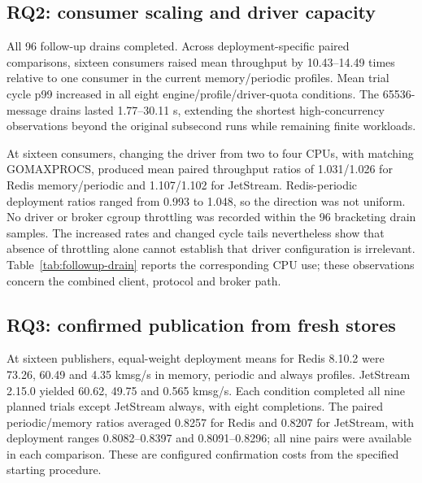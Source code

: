 \subsection{RQ2: consumer scaling and driver capacity}

All 96 follow-up drains completed. Across deployment-specific paired comparisons, sixteen consumers raised mean throughput by 10.43--14.49 times relative to one consumer in the current memory/periodic profiles. Mean trial cycle p99 increased in all eight engine/profile/driver-quota conditions. The 65536-message drains lasted 1.77--30.11 s, extending the shortest high-concurrency observations beyond the original subsecond runs while remaining finite workloads.

At sixteen consumers, changing the driver from two to four CPUs, with matching GOMAXPROCS, produced mean paired throughput ratios of 1.031/1.026 for Redis memory/periodic and 1.107/1.102 for JetStream. Redis-periodic deployment ratios ranged from 0.993 to 1.048, so the direction was not uniform. No driver or broker cgroup throttling was recorded within the 96 bracketing drain samples. The increased rates and changed cycle tails nevertheless show that absence of throttling alone cannot establish that driver configuration is irrelevant. Table~\ref{tab:followup-drain} reports the corresponding CPU use; these observations concern the combined client, protocol and broker path.

\begin{table}[htbp]
\centering\small\setlength{\tabcolsep}{3pt}

\caption{Current-release drain results. CPU is the driver's configured quota; $X_1$ and $X_{16}$ are throughput in kmsg/s. Point values equally weight campaign means. The speedup column gives the mean and range of campaign-specific paired ratios. Driver/Broker are mean CPU cores used during the bracketing samples at $C=16$, not percentages. M/P denote memory/periodic.}
\label{tab:followup-drain}
\end{table}

\subsection{RQ3: confirmed publication from fresh stores}

At sixteen publishers, equal-weight deployment means for Redis 8.10.2 were 73.26, 60.49 and 4.35 kmsg/s in memory, periodic and always profiles. JetStream 2.15.0 yielded 60.62, 49.75 and 0.565 kmsg/s. Each condition completed all nine planned trials except JetStream always, with eight completions. The paired periodic/memory ratios averaged 0.8257 for Redis and 0.8207 for JetStream, with deployment ranges 0.8082--0.8397 and 0.8091--0.8296; all nine pairs were available in each comparison. These are configured confirmation costs from the specified starting procedure.

